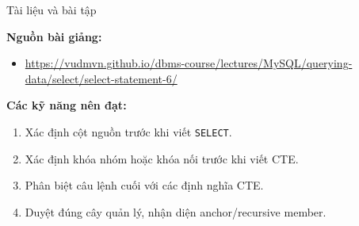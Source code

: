 \documentclass[aspectratio=169,10pt]{beamer}
\begin{document}
\begin{frame}[fragile]{Tài liệu và bài tập}

\small
\textbf{Nguồn bài giảng:}
\begin{itemize}
\item \url{https://vudmvn.github.io/dbms-course/lectures/MySQL/querying-data/select/select-statement-6/}
\end{itemize}
\vspace{.4cm}
\textbf{Các kỹ năng nên đạt:}
\begin{enumerate}
\item Xác định cột nguồn trước khi viết \texttt{SELECT}.
\item Xác định khóa nhóm hoặc khóa nối trước khi viết CTE.
\item Phân biệt câu lệnh cuối với các định nghĩa CTE.
\item Duyệt đúng cây quản lý, nhận diện anchor/recursive member.
\end{enumerate}
\end{frame}
\end{document}
